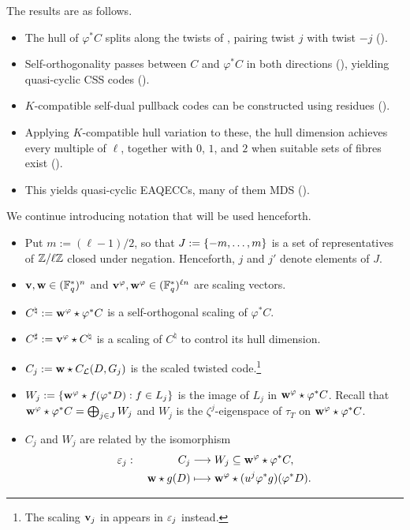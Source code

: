 \documentclass[twocolumn, 11pt]{scrartcl}
\begin{document}
The results are as follows.
\begin{itemize}
    \item The hull of $\varphi^*C$ splits along the twists of , pairing twist $j$ with twist $-j$ ().
    \item Self-orthogonality passes between $C$ and $\varphi^*C$ in both directions (), yielding quasi-cyclic CSS codes ().
    \item $K$-compatible self-dual pullback codes can be constructed using residues ().
    \item Applying $K$-compatible hull variation to these, the hull dimension achieves every multiple of $\ell$, together with $0$, $1$, and $2$ when suitable sets of fibres exist ().
    \item This yields quasi-cyclic EAQECCs, many of them MDS ().
\end{itemize}

We continue introducing notation that will be used henceforth.
\begin{itemize}
    \item Put $m:=(\ell-1)/2$, so that $J:=\{-m,\hdots,m\}$ is a set of representatives of $\mathbb{Z}/\ell\mathbb{Z}$ closed under negation. Henceforth, $j$ and $j'$ denote elements of $J$.
    \item $\mathbf{v},\mathbf{w}\in(\mathbb{F}_q^*)^n$ and $\mathbf{v}^\varphi,\mathbf{w}^\varphi\in(\mathbb{F}_q^*)^{\ell n}$ are scaling vectors.
    \item $C^\natural:=\mathbf{w}^\varphi\star\varphi^*C$ is a self-orthogonal scaling of $\varphi^*C$.
    \item $C^\sharp:=\mathbf{v}^\varphi\star C^\natural$ is a scaling of $C^\natural$ to control its hull dimension.
    \item $C_j:=\mathbf{w}\star C_\mathcal{L}(D,G_j)$ is the scaled twisted code.\footnote{The scaling $\mathbf{v}_j$ in  appears in $\varepsilon_j$ instead.}
    \item $W_j:=\{\mathbf{w}^\varphi\star f(\varphi^*D):f\in L_j\}$ is the image of $L_j$ in $\mathbf{w}^\varphi\star\varphi^*C$. Recall that $\mathbf{w}^\varphi\star \varphi^*C=\bigoplus_{j\in J}W_j$ and $W_j$ is the $\zeta^j$-eigenspace of $\tau_T$ on $\mathbf{w}^\varphi\star\varphi^*C$.
    \item $C_j$ and $W_j$ are related by the isomorphism
        \begin{alignat*}{2}
        \varepsilon_j:\;&&C_j&\longrightarrow W_j\subseteq\mathbf{w}^\varphi\star\varphi^*C,\\
        &&\mathbf{w}\star g(D)&\longmapsto\mathbf{w}^\varphi\star(u^j\varphi^*g)(\varphi^*D).
        \end{alignat*}
\end{itemize}
\end{document}
